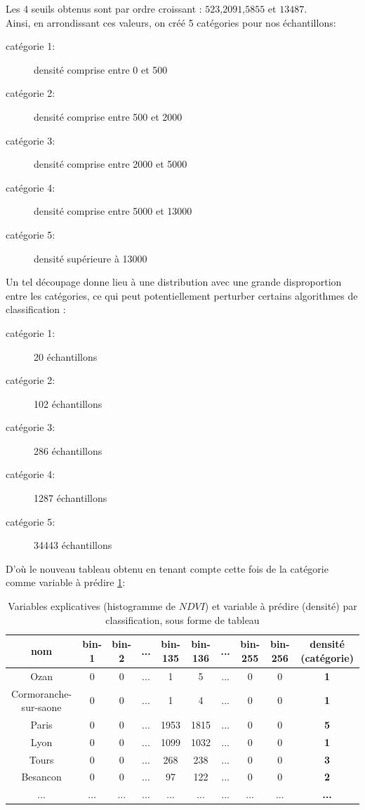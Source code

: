 \documentclass{book}
\begin{document}
Les 4 seuils obtenus sont par ordre croissant : $523$,$2091$,$5855$ et $13487$.\\
Ainsi, en arrondissant ces valeurs, on créé 5 catégories pour nos échantillons:\\
\begin{description}
 \item[catégorie 1:] densité comprise entre 0 et 500
 \item[catégorie 2:] densité comprise entre 500 et 2000
 \item[catégorie 3:] densité comprise entre 2000 et 5000
 \item[catégorie 4:] densité comprise entre 5000 et 13000
 \item[catégorie 5:] densité supérieure à 13000 
\end{description}
\clearpage

Un tel découpage donne lieu à une distribution avec une grande disproportion entre les catégories, ce qui peut potentiellement perturber certains algorithmes de classification :\\
\begin{description}
 \item[catégorie 1:] 20 échantillons
 \item[catégorie 2:] 102 échantillons
 \item[catégorie 3:] 286 échantillons
 \item[catégorie 4:] 1287 échantillons
 \item[catégorie 5:] 34443 échantillons
\end{description}

D'où le nouveau tableau obtenu en tenant compte cette fois de la catégorie comme variable à prédire \ref{data_class}:\\
\begin{table}[H]
\begin{center}
\begin{adjustbox}{max width=\textwidth}
\begin{tabular}{|c|c|c|c|c|c|c|c|c|>{\bfseries}c|}
\hline 
nom &  bin-1 & bin-2 & ... & bin-135 & bin-136 &... & bin-255 & bin-256 & densité (catégorie) \\
\hline 
Ozan & 0 & 0 & ... & 1 & 5 & ... & 0 & 0 & 1\\
\hline 
Cormoranche-sur-saone & 0 & 0 & ... & 1 & 4 & ... & 0 & 0 & 1\\
\hline 
Paris & 0 & 0 & ... & 1953 & 1815 & ... & 0 & 0 & 5\\
\hline
Lyon & 0 & 0 & ... & 1099 & 1032 & ... & 0 & 0 & 1\\
\hline
Tours & 0 & 0 & ... & 268 & 238 & ... & 0 & 0 & 3\\
\hline
Besancon & 0 & 0 & ... & 97 & 122 & ... & 0 & 0 & 2\\
\hline 
... & ... & ... & ... & ... & ... & ... & ... & ... & ... \\
\hline
\end{tabular}
\end{adjustbox}
\end{center}
\caption{Variables explicatives (histogramme de $NDVI$) et variable à prédire (densité) par classification, sous forme de tableau}
\label{data_class}
\end{table}
\end{document}
